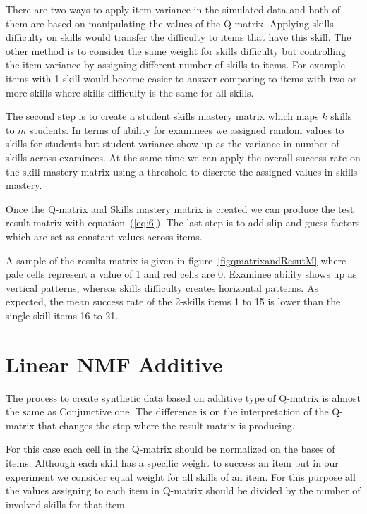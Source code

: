 There are two ways to apply item variance in the simulated data and both of them are based on manipulating the values of the Q-matrix. Applying skills difficulty on skills would transfer the difficulty to items that have this skill. The other method is to consider the same weight for skills difficulty but controlling the item variance by assigning different number of skills to items. For example items with 1 skill would become easier to answer comparing to items with two or more skills where skills difficulty is the same for all skills. 

The second step is to create a student skills mastery matrix which maps $k$ skills to $m$ students. In terms of ability for examinees we assigned random values to skills for students but  student variance show up as the variance in number of skills across examinees. At the same time we can apply the overall success rate on the skill mastery matrix using a threshold to discrete the assigned values in skills mastery. 

Once the Q-matrix and Skills mastery matrix is created we can produce the test result matrix with equation~(\ref{eq:6}). The last step is to add slip and guess factors which are set as constant values across items.

A sample of the results matrix is given in figure~\ref{figqmatrixandResutM} where pale cells represent a value of 1 and red cells are 0. Examinee ability shows up as vertical patterns, whereas skills difficulty creates horizontal patterns. As expected, the mean success rate of the 2-skills items 1 to 15 is lower than the single skill items 16 to 21.

\section{Linear NMF Additive}

The process to create synthetic data based on additive type of Q-matrix is almost the same as Conjunctive one. The difference is on the interpretation of the Q-matrix that changes the step where the result matrix is producing.

For this case each cell in the Q-matrix should be normalized on the bases of items. Although each skill has a specific weight to success an item but in our experiment we consider equal weight for all skills of an item. For this purpose all the values assigning to each item in Q-matrix should be divided by the number of involved skills for that item.

